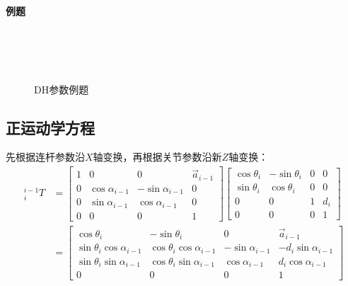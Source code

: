 \documentclass[
12pt, %
a4paper, 
oneside, %
headinclude,footinclude, %
]{scrartcl}
\begin{document}
\paragraph{例题}
\begin{figure}[H]
\centering
\subfloat[例1结构图]{\texttt{[image: 1.1.1]}} \quad
\subfloat[例2结构图]{\texttt{[image: 1.2.1]}} \\
\subfloat[例1参数表]{\texttt{[image: 1.1.2]}} \quad
\subfloat[例2参数表]{\texttt{[image: 1.2.2]}} \\
\subfloat[例3结构图]{\texttt{[image: 1.3.1]}} \quad
\subfloat[例4结构图]{\texttt{[image: 1.4.1]}} \\
\subfloat[例3参数表]{\texttt{[image: 1.3.2]}} \quad
\subfloat[例4参数表]{\texttt{[image: 1.4.2]}}
\caption[DH参数例题]{DH参数例题}
\end{figure}
\subsection{正运动学方程}
先根据连杆参数沿$ X $轴变换，再根据关节参数沿新$ Z $轴变换：
\begin{align*}
^{i - 1}_i T 
&= 
\begin{bmatrix} 1 & 0 & 0 & \vec a_{i - 1} \\ 0 & \cos \alpha_{i - 1} & -\sin \alpha_{i - 1} & 0 \\ 0 & \sin \alpha_{i - 1} & \cos \alpha_{i - 1} & 0 \\ 0 & 0 & 0 & 1 \end{bmatrix}
\begin{bmatrix} \cos \theta_i & -\sin \theta_i & 0 & 0 \\ \sin \theta_i & \cos \theta_i & 0 & 0 \\ 0 & 0 & 1 & d_i \\ 0 & 0 & 0 & 1 \end{bmatrix} \\
&= 
\begin{bmatrix} \cos\theta_i & -\sin\theta_i & 0 & \vec a_{i-1} \\ \sin\theta_i\cos\alpha_{i-1} & \cos\theta_i\cos\alpha_{i-1} & -\sin\alpha_{i-1} & -d_i\sin\alpha_{i-1} \\ \sin\theta_i\sin\alpha_{i-1} & \cos\theta_i\sin\alpha_{i-1} & \cos\alpha_{i-1} & d_i\cos\alpha_{i-1} \\ 0 & 0 & 0 & 1 \end{bmatrix}
\end{align*}
\end{document}
